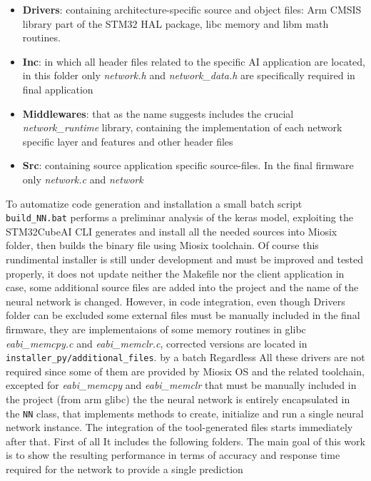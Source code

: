 \begin{itemize}
	\item \textbf{Drivers}: containing architecture-specific source and object files: Arm CMSIS library part of the STM32 HAL package, libc memory and libm math routines. 
	\item \textbf{Inc}: in which all header files related to the specific AI application are located, in this folder only \textit{network.h} and \textit{network\_data.h} are specifically required in final application
	\item \textbf{Middlewares}: that as the name suggests includes the crucial \textit{network\_runtime} library, containing the implementation of each network specific layer and features and other header files
	\item \textbf{Src}: containing source application specific source-files. In the final firmware only \textit{network.c} and \textit{network}
\end{itemize} 
To automatize code generation and installation a small batch script \texttt{build_NN.bat} performs a preliminar analysis of the keras model, exploiting the STM32CubeAI CLI generates and install all the needed sources into Miosix folder, then builds the binary file using Miosix toolchain. Of course this rundimental installer is still under development and must be improved and tested properly, it does not update neither the Makefile nor the client application in case, some additional source files are added into the project and the name of the neural network is changed. However, in code integration, even though Drivers folder can be excluded some external files must be manually included in the final firmware, they are implementaions of some memory routines in glibc \textit{eabi\_memcpy.c} and \textit{eabi\_memclr.c}, corrected versions are located in \texttt{installer_py/additional_files}.    by a batch  Regardless All these drivers are not required since some of them are provided by Miosix OS and the related toolchain, excepted for \textit{eabi\_memcpy} and \textit{eabi\_memclr} that must be manually included in the project (from arm glibc) the  the neural network is entirely encapsulated in the \texttt{NN} class, that implements methods to create, initialize and run a single neural network instance. The integration of the tool-generated files starts immediately after that. First of all It includes the following folders.
The main goal of this work is to show the resulting performance in terms of accuracy and response time required for the network to provide a single prediction


